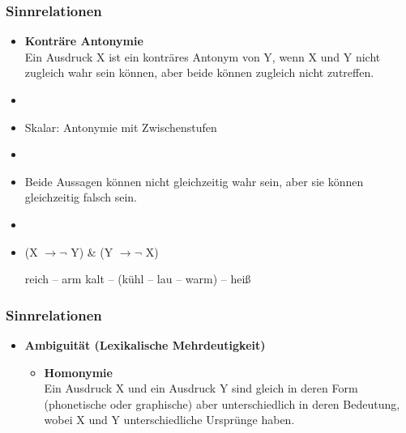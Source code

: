 \begin{frame}
\frametitle{Sinnrelationen}

\begin{itemize}
	\item \textbf{Konträre Antonymie}\\
Ein Ausdruck X ist ein konträres Antonym von Y, wenn X und Y nicht zugleich wahr sein können, aber beide können zugleich nicht zutreffen.
	\item[]
	\item Skalar: Antonymie mit Zwischenstufen
	\item[]
	\item Beide Aussagen können nicht gleichzeitig wahr sein, aber sie können gleichzeitig falsch sein.
	\item[]
	\item (X $\rightarrow \lnot$ Y) \& (Y $\rightarrow \lnot$ X)
	
	\eal
		\ex reich -- arm
		\ex kalt -- (kühl -- lau -- warm) -- heiß
	\zl
	
\end{itemize}

\end{frame}



\begin{frame}
\frametitle{Sinnrelationen}

\begin{itemize}
	\item \textbf{Ambiguität (Lexikalische Mehrdeutigkeit)}

\vspace{1em}

	\begin{itemize}
		\item \textbf{Homonymie}\\
Ein Ausdruck X und ein Ausdruck Y sind gleich in deren Form (phonetische oder graphische) aber unterschiedlich in deren Bedeutung, wobei X und Y unterschiedliche Ursprünge haben.
	\end{itemize}
\end{itemize}

\end{frame}



